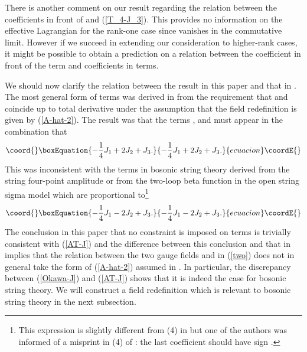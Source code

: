 \documentclass[a4paper,12pt]{article}
\begin{document}
There is another comment on our result regarding
the relation between the coefficients in front of
\coordHE{} and \coordHE{} (\ref{T_4-J_3}).
This provides no information on the effective Lagrangian
for the rank-one case since \coordHE{} vanishes
in the commutative limit.
However if we succeed in extending our consideration
to higher-rank cases, it might be possible to obtain
a prediction on a relation between the coefficient in front of
the \coordHE{} term and coefficients in \coordHE{} terms.

We should now clarify the relation between the result in this paper
and that in \cite{Okawa}.
The most general form of \coordHE{} terms
was derived in \cite{Okawa} from the requirement that
\coordHE{} and \coordHE{} coincide
up to total derivative under the assumption that
the field redefinition is given by (\ref{A-hat-2}).
The result was that the terms \coordHE{}, \coordHE{} and \coordHE{} must appear
in the combination that
\begin{equation}\coord{}\boxEquation{
-\frac{1}{4} J_1 +2 J_2 + J_3.
\label{Okawa-J}
}{
-\frac{1}{4} J_1 +2 J_2 + J_3.
}{ecuacion}\coordE{}\end{equation}
This was inconsistent with
the \coordHE{} terms
in bosonic string theory derived from the string four-point
amplitude \cite{AT1} or from
the two-loop beta function
in the open string sigma model \cite{AT2}
which are proportional to\footnote{
This expression is slightly different from
(4) in \cite{AT2} but one of
the authors was informed of
a misprint in (4) of \cite{AT2}:
the last coefficient \coordHE{} should have sign \myHighlight{$+$}\coordHE{}.
}
\begin{equation}\coord{}\boxEquation{
-\frac{1}{4} J_1 -2 J_2 + J_3.
\label{AT-J}
}{
-\frac{1}{4} J_1 -2 J_2 + J_3.
}{ecuacion}\coordE{}\end{equation}
The conclusion in this paper that no constraint is imposed
on \coordHE{} terms
is trivially consistent with (\ref{AT-J})
and the difference between this conclusion
and that in \cite{Okawa} implies that
the relation between
the two gauge fields \coordHE{} and \coordHE{} in (\ref{two})
does not in general take the form of (\ref{A-hat-2})
assumed in \cite{Okawa}.
In particular, the discrepancy
between (\ref{Okawa-J}) and (\ref{AT-J})
shows that it is indeed the case for bosonic string theory.
We will construct a field redefinition which is relevant
to bosonic string theory in the next subsection.
\end{document}
